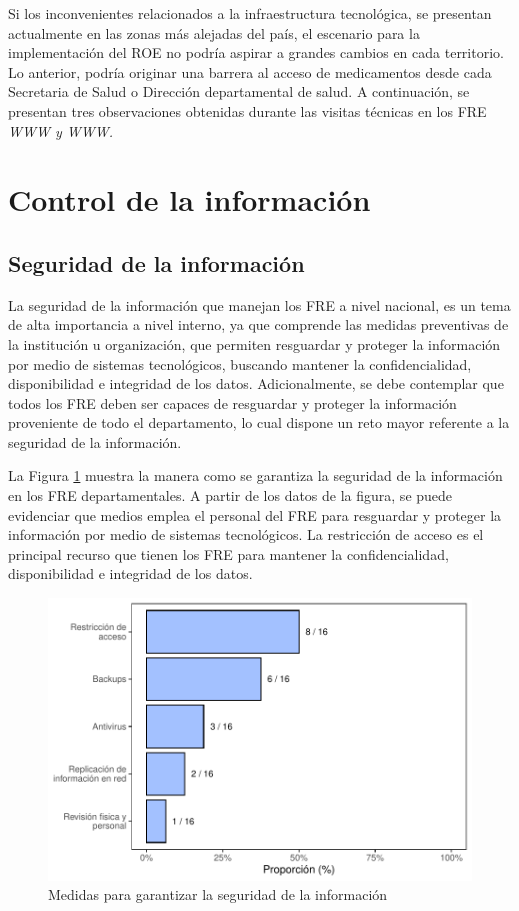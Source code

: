 \documentclass[
]{book}
\begin{document}
Si los inconvenientes relacionados a la infraestructura tecnológica, se presentan actualmente en las zonas más alejadas del país, el escenario para la implementación del ROE no podría aspirar a grandes cambios en cada territorio. Lo anterior, podría originar una barrera al acceso de medicamentos desde cada Secretaria de Salud o Dirección departamental de salud. A continuación, se presentan tres observaciones obtenidas durante las visitas técnicas en los FRE \emph{WWW y WWW.}

\hypertarget{control-de-la-informaciuxf3n}{%
\section{Control de la información}\label{control-de-la-informaciuxf3n}}

\hypertarget{seguridad-de-la-informaciuxf3n}{%
\subsection{Seguridad de la información}\label{seguridad-de-la-informaciuxf3n}}

La seguridad de la información que manejan los FRE a nivel nacional, es un tema de alta importancia a nivel interno, ya que comprende las medidas preventivas de la institución u organización, que permiten resguardar y proteger la información por medio de sistemas tecnológicos, buscando mantener la confidencialidad, disponibilidad e integridad de los datos. Adicionalmente, se debe contemplar que todos los FRE deben ser capaces de resguardar y proteger la información proveniente de todo el departamento, lo cual dispone un reto mayor referente a la seguridad de la información.

La Figura \ref{fig:GarantiaInformacion} muestra la manera como se garantiza la seguridad de la información en los FRE departamentales. A partir de los datos de la figura, se puede evidenciar que medios emplea el personal del FRE para resguardar y proteger la información por medio de sistemas tecnológicos. La restricción de acceso es el principal recurso que tienen los FRE para mantener la confidencialidad, disponibilidad e integridad de los datos.

\begin{figure}
\includegraphics[width=0.85\linewidth]{InformeFinal_files/figure-latex/GarantiaInformacion-1} \caption{Medidas para garantizar la seguridad de la información}\label{fig:GarantiaInformacion}
\end{figure}
\end{document}
